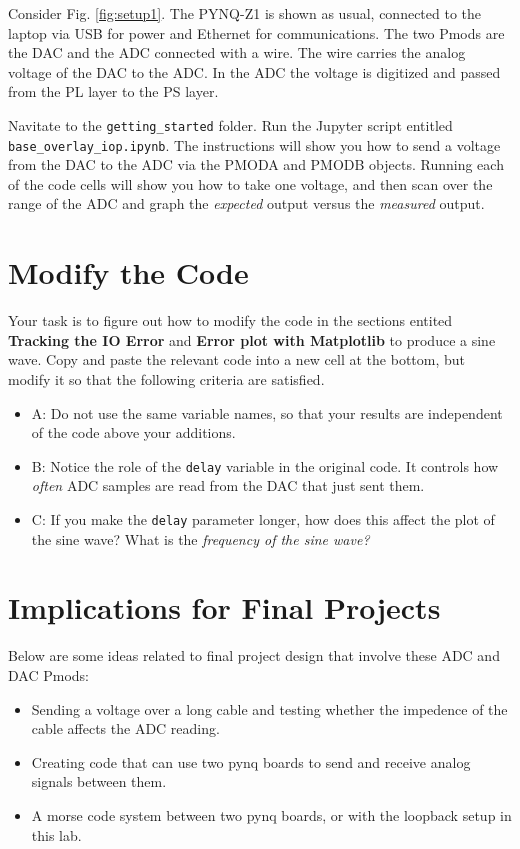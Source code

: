 \documentclass{article}
\begin{document}
Consider Fig. \ref{fig:setup1}.  The PYNQ-Z1 is shown as usual, connected to the laptop via USB for power and Ethernet for communications.  The two Pmods are the DAC and the ADC connected with a wire.  The wire carries the analog voltage of the DAC to the ADC.  In the ADC the voltage is digitized and passed from the PL layer to the PS layer.

Navitate to the \verb+getting_started+ folder.  Run the Jupyter script entitled \verb+base_overlay_iop.ipynb+.  The instructions will show you how to send a voltage from the DAC to the ADC via the PMODA and PMODB objects.  Running each of the code cells will show you how to take one voltage, and then scan over the range of the ADC and graph the \textit{expected} output versus the \textit{measured} output.

\section{Modify the Code}

Your task is to figure out how to modify the code in the sections entited \textbf{Tracking the IO Error} and \textbf{Error plot with Matplotlib} to produce a sine wave. Copy and paste the relevant code into a new cell at the bottom, but modify it so that the following criteria are satisfied.

\begin{itemize}
\item A: Do not use the same variable names, so that your results are independent of the code above your additions.
\item B: Notice the role of the \verb+delay+ variable in the original code.  It controls how \textit{often} ADC samples are read from the DAC that just sent them.
\item C: If you make the \verb+delay+ parameter longer, how does this affect the plot of the sine wave?  What is the \textit{frequency of the sine wave?}
\end{itemize}

\section{Implications for Final Projects}

Below are some ideas related to final project design that involve these ADC and DAC Pmods:

\begin{itemize}
\item Sending a voltage over a long cable and testing whether the impedence of the cable affects the ADC reading.
\item Creating code that can use two pynq boards to send and receive analog signals between them.
\item A morse code system between two pynq boards, or with the loopback setup in this lab.
\end{itemize}
\end{document}
